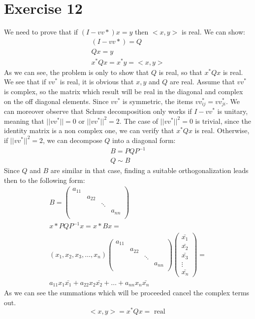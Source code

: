 \section{Exercise 12}
We need to prove that if $(I-vv*) x = y$ then $<x,y>$ is real.
We can show:
\begin{gather*}
(I-vv*) = Q \\
Qx = y \\
x^{*} Q x = x^{*} y = <x,y>
\end{gather*}
As we can see, the problem is only to show that $Q$ is real, so that $x^* Q x $ is real.
We see that if $vv^*$ is real, it is obvious that $x,y$ and $Q$ are real.
Assume that $vv^*$ is complex, so the matrix which result will be real in the diagonal and complex on the off diagonal elements.
Since $vv^*$ is symmetric, the items $vv^{*}_{ij} = vv^{*}_{ji}$.
We can moreover observe that Schurs decomposition only works if $ I - vv^*$ is unitary, meaning that $ || vv^* || = 0 $ or $|| vv^* ||^2 =2 $.
The case of $|| vv^* ||^2 = 0$ is trivial, since the identity matrix is a non complex one, we can verify that $x^*Qx$ is real.
Otherwise, if $ || vv^* ||^2 = 2$, we can decompose $Q$ into a diagonal form: 
\begin{gather*}
B = PQP^{-1} \\
Q \sim B
\end{gather*}
Since $Q$ and $B$ are similar in that case, finding a suitable orthogonalization leads then to the following form:
\begin{gather*}
B = \left( \begin{array}{cccc}
a_{11}& & &\\
& a_{22}& &\\
& & \ddots &\\
& & & a_{nn}\\
\end{array} \right)\\
x*PQP^{-1}x = x*Bx = \\ \left(
x_1, x_2, x_3, \hdots, x_n \right)
\left( \begin{array}{cccc}
a_{11}& & &\\
& a_{22}& &\\
& & \ddots &\\
& & & a_{nn}\\
\end{array} \right)
\left( \begin{array}{c}
\bar{x_1} \\
\bar{x_2} \\
\bar{x_3} \\ 
\vdots \\
\bar{x_n}
\end{array} \right) =
\\
a_{11} x_1 \bar{x_1} + a_{22} x_2 \bar{x_2} + \ldots + a_{nn} x_n \bar{x_n}
\end{gather*}
As we can see the summations which will be proceeded cancel the complex terms out.
\begin{equation}
<x,y> = x^*Qx = \text{ real }
\end{equation}

